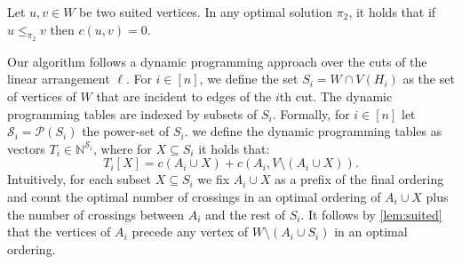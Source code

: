 \documentclass[a4paper,UKenglish,cleveref, autoref, thm-restate]{lipics-v2021}
\newcommand{\layertwo}{\ensuremath{W}}
\begin{document}
\begin{lemma}\label{lem:suited}
    Let $u,v \in \layertwo$ be two suited vertices. In any optimal solution $\pi_2$, it holds that if $u\leq_{\pi_2} v$ then $c(u,v) = 0$.
\end{lemma}
Our algorithm follows a dynamic programming approach over the cuts of the linear arrangement $\ell$.
For $i\in[n]$, we define the set $S_i = \layertwo \cap V(H_i)$ as the set of vertices of $\layertwo$ that are incident to edges of the $i$th cut.
The dynamic programming tables are indexed by subsets of $S_i$.
Formally, for $i\in [n]$ let $\mathcal{S}_i = \mathcal{P}(S_i)$ the power-set of $S_i$. we define the dynamic programming tables as vectors $T_i \in \mathbb{N}^{\mathcal{S}_i}$, where for $X\subseteq S_i$ it holds that:
\begin{equation} \label{eq:t-def}
T_i[X] = c(A_i\cup X) + c(A_i, V\setminus (A_i\cup X)).
\end{equation}
Intuitively, for each subset $X \subseteq S_i$ we fix $A_i\cup X$ as a prefix of the final ordering and count the optimal number of crossings in an optimal ordering of $A_i \cup X$ plus the number of crossings between $A_i$ and the rest of $S_i$. It follows by \cref{lem:suited} that the vertices of $A_i$ precede any vertex of $W\setminus (A_i\cup S_i)$ in an optimal ordering.
\end{document}
